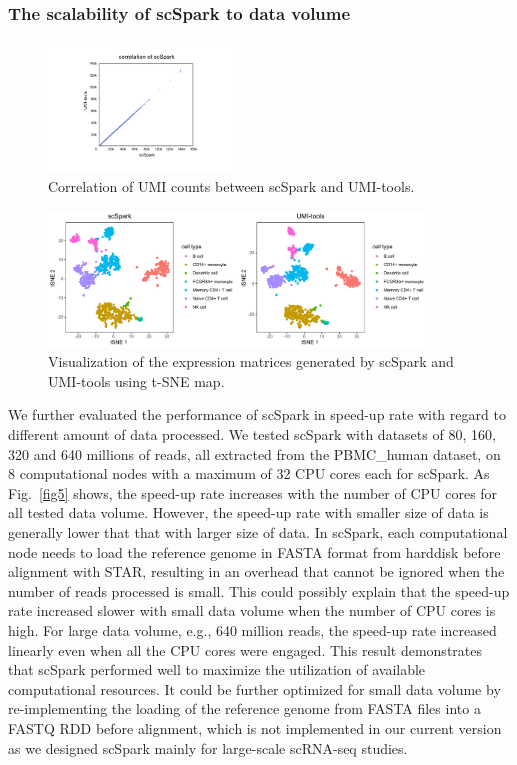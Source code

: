 \documentclass[conference]{IEEEtran}
\begin{document}
\subsubsection{The scalability of scSpark to data volume}
\begin{figure}
	\centering
	\includegraphics[width=0.45\textwidth]{fig6.pdf}
	\caption{Correlation of UMI counts between scSpark and UMI-tools.} \label{fig6}
\end{figure}
\begin{figure}
	\centering
	\includegraphics[width=0.9\textwidth]{fig7.pdf}
	\caption{Visualization of the expression matrices generated by scSpark and UMI-tools using t-SNE map.} \label{fig7}
\end{figure}

We further evaluated the performance of scSpark in speed-up rate with regard to different amount of data processed.  
We tested scSpark with datasets of 80, 160, 320 and 640 millions of reads, all extracted from the PBMC\_human dataset, on 8 computational nodes with a maximum of 32 CPU cores each for scSpark. 
As Fig.~\ref{fig5} shows, the speed-up rate increases with the number of CPU cores for all tested data volume. 
However, the speed-up rate with smaller size of data is generally lower that that with larger size of data. 
In scSpark, each computational node needs to load the reference genome in FASTA format from harddisk before alignment with STAR, resulting in an overhead that cannot be ignored when the number of reads processed is small. 
This could possibly explain that the speed-up rate increased slower with small data volume when the number of CPU cores is high.  
For large data volume, e.g., 640 million reads, the speed-up rate increased linearly even when all the CPU cores were engaged.  
This result demonstrates that scSpark performed well to maximize the utilization of available computational resources. It could be further optimized for small data volume by re-implementing the loading of the reference genome from FASTA files into a FASTQ RDD before alignment, which is not implemented in our current version as we designed scSpark mainly for large-scale scRNA-seq studies. 
\end{document}
